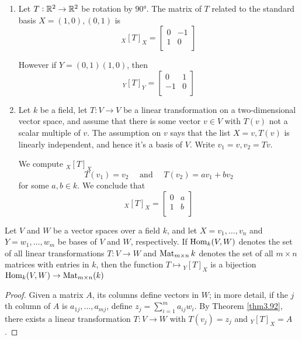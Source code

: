 \documentclass[11pt]{article}
\begin{document}
\begin{examplle}[]
\begin{enumerate}
\item Let \(T:\mathbb{R}^2\to \mathbb{R}^2\) be rotation by \(\ang{90}\). The matrix of \(T\)
related to the standard basis \(X=(1,0),(0,1)\) is 
\[
{}_X[T]_X=\begin{bmatrix}
 0 & -1 \\
 1 & 0 \\
\end{bmatrix}
\]

However if \(Y=(0,1)(1,0)\), then
\[
{}_Y[T]_Y=\begin{bmatrix}
 0 & 1 \\
 -1 & 0 \\
\end{bmatrix}
\]
\item Let \(k\) be a field, let \(T:V\to V\) be a linear transformation on a
two-dimensional vector space, and assume that there is some vector
\(v\in V\) with \(T(v)\) not a scalar multiple of \(v\). The assumption on
\(v\) says that the list \(X=v,T(v)\) is linearly independent, and hence
it's a basis of \(V\). Write \(v_1=v,v_2=Tv\).

We compute \({}_X[T]_X\)
\begin{equation*}
T(v_1)=v_2\quad\text{ and }\quad T(v_2)=av_1+bv_2
\end{equation*}
for some \(a,b\in k\). We conclude that
\[
{}_X[T]_X=\begin{bmatrix}
 0 & a \\
 1 & b \\
\end{bmatrix}
\]
\end{enumerate}
\end{examplle}

\begin{proposition}[]
\label{prop3.97}
Let \(V\) and \(W\) be a vector spaces over a field \(k\), and let
\(X=v_1,\dots,v_n\) and \(Y=w_1,\dots,w_m\) be bases of \(V\) and \(W\),
respectively. If \(\operatorname{Hom}_k(V,W)\) denotes the set of all linear
transformations \(T:V\to W\) and \(\operatorname{Mat}_{m\times n}k\) denotes the set of
all \(m\times n\) matrices with entries in \(k\), then the function 
\(T\mapsto{}_Y[T]_X\) is a bijection \(\operatorname{Hom}_k(V,W)\to\operatorname{Mat}_{m\times n}(k)\) 
\end{proposition}

\begin{proof}
Given a matrix \(A\), its columns define vectors in \(W\); in more detail,
if the \(j\)th column of \(A\) is \(a_{1j},\dots,a_{mj}\), define
\(z_j=\sum_{i=1}^ma_{ij}w_i\). By Theorem \ref{thm3.92}, there exists a linear
transformation \(T:V\to W\) with \(T(v_j)=z_j\) and \({}_Y[T]_X=A\).
\end{proof}
\end{document}

